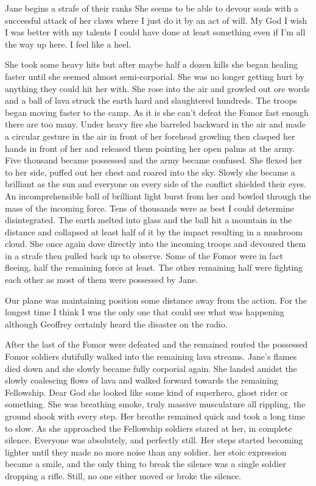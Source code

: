 Jane begins a strafe of their ranks She seems to be able to devour souls with a successful attack of her claws where I just do it by an act of will. My God I wish I was better with my talents I could have done at least something even if I'm all the way up here. I feel like a heel.

She took some heavy hits but after maybe half a dozen kills she began healing faster until she seemed almost semi-corporial. She was no longer getting hurt by anything they could hit her with. She rose into the air and growled out ore words \enochianxx and a ball of lava struck the earth hard and slaughtered hundreds. The troops began moving faster to the camp. As it is she can't defeat the Fomor fast enough there are too many. Under heavy fire she barreled backward in the air and made a circular gesture in the air in front of her forehead growling \enochianxx then clasped her hands in front of her and released them pointing her open palms at the army. Five thousand became possessed and the army became confused. She flexed her to her side, puffed out her chest and roared into the sky. Slowly she became a brilliant as the sun and everyone on every side of the conflict shielded their eyes. An incomprehensible ball of brilliant light burst from her and bowled through the mass of the incoming force. Tens of thousands were as best I could determine disintegrated. The earth melted into glass and the ball hit a mountain in the distance and collapsed at least half of it by the impact resulting in a mushroom cloud. She once again dove directly into the incoming troops and devoured them in a strafe then pulled back up to observe. Some of the Fomor were in fact fleeing, half the remaining force at least. The other remaining half were fighting each other as most of them were possessed by Jane.

Our plane was maintaining position some distance away from the action. For the longest time I think I was the only one that could see what was happening although Geoffrey certainly heard the disaster on the radio.

After the last of the Fomor were defeated and the remained routed the possessed Fomor soldiers dutifully walked into the remaining lava streams. Jane's flames died down and she slowly became fully corporial again. She landed amidst the slowly coalescing flows of lava and walked forward towards the remaining Fellowship. Dear God she looked like some kind of superhero, ghost rider or something. She was breathing smoke, truly massive musculature all rippling, the ground shook with every step. Her breathe remained quick and took a long time to slow. As she approached the Fellowship soldiers stared at her, in complete silence. Everyone was absolutely, and perfectly still. Her steps started becoming lighter until they made no more noise than any soldier. her stoic expression became a smile, and the only thing to break the silence was a single soldier dropping a rifle. Still, no one either moved or broke the silence.

